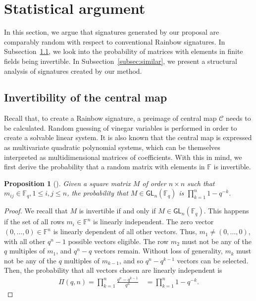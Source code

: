 \documentclass[12pt, a4paper, oneside]{memoir}
\newtheorem{proposition}[theorem]{Proposition}
\theoremstyle{definition}
\begin{document}
\section{Statistical argument}\label{sec:stats}

In this section, we argue that signatures generated by our proposal are comparably random with respect to conventional Rainbow signatures. In Subsection~\ref{subsec:invert}, we look into the probability of matrices with elements in finite fields being invertible. In Subsection~\ref{subsec:similar}, we present a structural analysis of signatures created by our method.

\subsection{Invertibility of the central map}\label{subsec:invert}

Recall that, to create a Rainbow signature, a preimage of central map $\mathcal{C}$ needs to be calculated. Random guessing of vinegar variables is performed in order to create a solvable linear system. It is also known that the central map is expressed as multivariate quadratic polynomial systems, which can be themselves interpreted as multidimensional matrices of coefficients. With this in mind, we first derive the probability that a random matrix with elements in $\mathbb{F}$ is invertible.

\begin{proposition}[{\cite[Remark 13.2.14]{Mullen:2013}}]
  Given a square matrix $M$ of order $n \times n$ such that $m_{ij} \in \mathbb{F}_{q}, 1 \leq i, j \leq n$, the probability that $M \in \mathsf{GL}_{n}(\mathbb{F}_{q})$ is $\prod_{k = 1}^{n} 1 - q^{-k}$.
\end{proposition}
\begin{proof}
  We recall that $M$ is invertible if and only if $M \in \mathsf{GL}_{n}(\mathbb{F}_{q})$. This happens if the set of all rows $m_{i} \in \mathbb{F}^{n}$ is linearly independent. The zero vector $(0, \dots, 0) \in \mathbb{F}^{n}$ is linearly dependent of all other vectors. Thus, $m_{1} \neq (0, \dots, 0)$, with all other $q^{n} - 1$ possible vectors eligible. The row $m_{2}$ must not be any of the $q$ multiples of $m_{1}$, and $q^{n} - q$ vectors remain. Without loss of generality, $m_{k}$ must not be any of the $q$ multiples of $m_{k - 1}$, and so $q^{n} - q^{k - 1}$ vectors can be selected. Then, the probability that all vectors chosen are linearly independent is
  \begin{align}
    \Pi(q, n) = \prod_{k = 1}^{n} \frac{q^{n} - q^{k - 1}}{q^{n}} \quad
      = \prod_{k = 1}^{n} 1 - q^{-k}.
  \end{align}
\end{proof}
\end{document}

